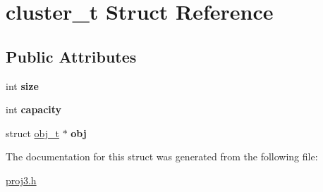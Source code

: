\hypertarget{structcluster__t}{}\section{cluster\+\_\+t Struct Reference}
\label{structcluster__t}
\subsection*{Public Attributes}
\begin{DoxyCompactItemize}
\item 
\hypertarget{structcluster__t_ae1463905fc36c25032381b8e49359823}{}\label{structcluster__t_ae1463905fc36c25032381b8e49359823} 
int {\bfseries size}
\item 
\hypertarget{structcluster__t_acee92791a353de443b8a93e1a68e721f}{}\label{structcluster__t_acee92791a353de443b8a93e1a68e721f} 
int {\bfseries capacity}
\item 
\hypertarget{structcluster__t_a30eaceafae29d1a5b6f0fca36562c473}{}\label{structcluster__t_a30eaceafae29d1a5b6f0fca36562c473} 
struct \hyperlink{structobj__t}{obj\+\_\+t} $\ast$ {\bfseries obj}
\end{DoxyCompactItemize}


The documentation for this struct was generated from the following file\+:\begin{DoxyCompactItemize}
\item 
\hyperlink{proj3_8h}{proj3.\+h}\end{DoxyCompactItemize}
